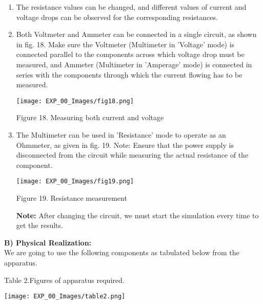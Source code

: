 \documentclass[12pt,a4paper]{article}
\begin{document}
\begin{justify}
\begin{enumerate}
\item The resistance values can be changed, and different values of current and voltage drops can be observed for the corresponding resistances.
\item Both Voltmeter and Ammeter can be connected in a single circuit, as shown in fig. 18. Make sure the Voltmeter (Multimeter in 'Voltage' mode) is connected parallel to the components across which voltage drop must be measured, and Ammeter (Multimeter in 'Amperage' mode) is connected in series with the components through which the current flowing has to be measured.

\begin{center} 
\texttt{[image: EXP\_00\_Images/fig18.png]}
\end{center}
\vspace{-8mm}
\begin{center} {Figure 18. Measuring both current and voltage}\end{center}

\item The Multimeter can be used in 'Resistance' mode to operate as an Ohmmeter, as given in fig. 19. Note: Ensure that the power supply is disconnected from the circuit while measuring the actual resistance of the component.
\begin{center} 
\texttt{[image: EXP\_00\_Images/fig19.png]}
\end{center}
\vspace{-8mm}
\begin{center} {Figure 19. Resistance measurement}\end{center}

\textbf{Note:} After changing the circuit, we must start the simulation every time to get the results.

\end{enumerate}

\noindent \textbf{B) Physical Realization: }\\[6pt]
\noindent We are going to use the following components as tabulated below from the apparatus.
\vspace{-3mm}
\begin{center} {Table 2.Figures of apparatus required.}\end{center}
\vspace{-8mm}
\begin{center} 
\texttt{[image: EXP\_00\_Images/table2.png]}
\end{center}


\end{justify}
\end{document}
